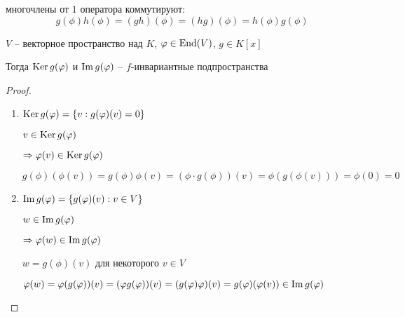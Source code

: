     \begin{corollary*}
        многочлены от $1$ оператора коммутируют:
        \[
            g(\phi)h(\phi) = (gh)(\phi) = (hg)(\phi) = h(\phi)g(\phi)    
        \]
    \end{corollary*}

    \begin{theorem}
        $V$ -- векторное пространство над $K$, $\varphi \in \operatorname{End}(V)$, $g \in K[x]$
        \par Тогда $\operatorname{Ker} g(\varphi)$ и $\operatorname{Im} g(\varphi)$ -- $f$-инвариантные подпространства
    \end{theorem}

    \begin{proof}
        $ $
        \begin{enumerate}
            \item $\operatorname{Ker} g(\varphi) = \{v : g(\varphi)(v) = 0\}$
                \par $v \in \operatorname{Ker} g(\varphi)$
                \par $\Rightarrow \varphi(v) \in \operatorname{Ker} g(\varphi)$
                \par $g(\phi)(\phi(v)) = g(\phi)\phi(v) = (\phi \cdot g (\phi))(v) = \phi(g(\phi(v))) = \phi(0) = 0$
            \item $\operatorname{Im} g(\varphi) = \{g(\varphi)(v) : v \in V\}$
                \par $w \in \operatorname{Im} g(\varphi)$
                \par $\Rightarrow \varphi(w) \in \operatorname{Im} g(\varphi)$
                \par $w = g(\phi)(v)$ для некоторого $v \in V$
                \par $\varphi(w) = \varphi(g(\varphi))(v) = (\varphi g(\varphi))(v) = (g(\varphi)\varphi)(v) = g(\varphi)(\varphi(v)) \in \operatorname{Im} g(\varphi)$
        \end{enumerate}
    \end{proof}

